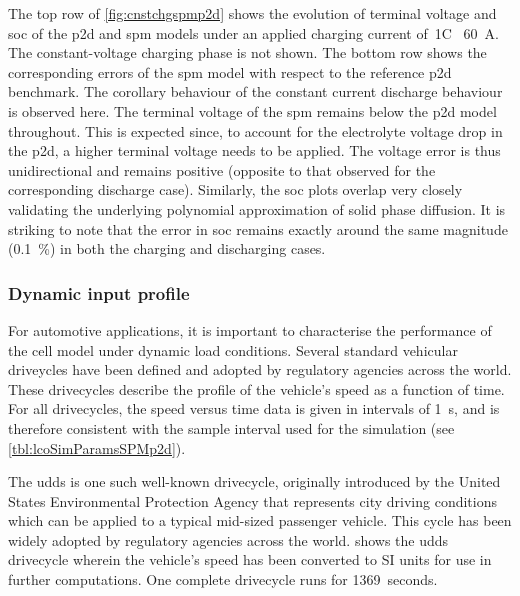 The top row of \cref{fig:cnstchgspmp2d} shows  the evolution of terminal voltage
and \gls{soc}  of the \gls{p2d} and  \gls{spm} models under an  applied charging
current of~1C \ie~\SI{60}{\ampere}.  The constant-voltage charging  phase is
not shown. The bottom row shows  the corresponding errors of the \gls{spm} model
with respect  to the reference  \gls{p2d} benchmark. The corollary  behaviour of
the constant current discharge behaviour  is observed here. The terminal voltage
of the \gls{spm} remains below the  \gls{p2d} model throughout. This is expected
since, to  account for the electrolyte  voltage drop in the  \gls{p2d}, a higher
terminal voltage needs  to be applied. The voltage error  is thus unidirectional
and remains positive (opposite to  that observed for the corresponding discharge
case).  Similarly,  the \gls{soc}  plots  overlap  very closely  validating  the
underlying polynomial approximation of solid  phase diffusion. It is striking to
note  that the  error in  \gls{soc} remains  exactly around  the same  magnitude
(\approx\SI{0.1}{\percent}) in both the charging and discharging cases.

\subsubsection*{Dynamic input profile}\label{subsubsec:dynamicspmp2dsim}

For automotive applications, it is  important to characterise the performance of
the  cell  model  under  dynamic load  conditions.  Several  standard  vehicular
driveycles  have been  defined and  adopted  by regulatory  agencies across  the
world.  These drivecycles  describe  the profile  of the  vehicle's  speed as  a
function of time.  For all drivecycles, the  speed versus time data  is given in
intervals  of  \SI{1}{\second}, and  is  therefore  consistent with  the  sample
interval used for the simulation (see \cref{tbl:lcoSimParamsSPMp2d}).

The \gls{udds} is  one such well-known drivecycle, originally  introduced by the
United  States  Environmental Protection  Agency  that  represents city  driving
conditions which can  be applied to a typical mid-sized  passenger vehicle. This
cycle  has  been  widely  adopted  by  regulatory  agencies  across  the  world.
  shows  the  \gls{udds} drivecycle  wherein  the
vehicle's speed has been converted to  SI units for use in further computations.
One complete drivecycle runs for 1369~seconds.

